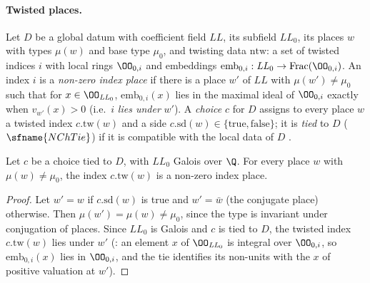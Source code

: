 \paragraph{Twisted places.} Let $D$ be a global datum with coefficient field $\mathit{LL}$, its subfield $\mathit{LL}_0$, its places
$w$ with types $\mu(w)$ and base type $\mu_0$, and twisting data $\mathrm{ntw}$: a set of twisted indices $i$ with local rings $\OO_{0,i}$
and embeddings $\mathrm{emb}_{0,i}:\mathit{LL}_0\to\mathrm{Frac}(\OO_{0,i})$. An index $i$ is a \emph{non-zero index place} if there is a place
$w'$ of $\mathit{LL}$ with $\mu(w')\ne\mu_0$ such that for $x\in\OO_{\mathit{LL}_0}$, $\mathrm{emb}_{0,i}(x)$ lies in the maximal ideal of
$\OO_{0,i}$ exactly when $v_{w'}(x)>0$ (i.e.\ $i$ \emph{lies under} $w'$). A \emph{choice} $c$ for $D$ assigns to every place $w$ a
twisted index $c.\mathrm{tw}(w)$ and a side $c.\mathrm{sd}(w)\in\{\mathrm{true},\mathrm{false}\}$; it is \emph{tied} to $D$
($\sfname{NChTie}$) if it is compatible with the local data of $D$ \cite{LeanSource2026}.

\begin{proposition}\label{pf:sh-div:twisted}
Let $c$ be a choice tied to $D$, with $\mathit{LL}_0$ Galois over $\Q$. For every place $w$ with $\mu(w)\ne\mu_0$, the index
$c.\mathrm{tw}(w)$ is a non-zero index place.
\end{proposition}

\begin{proof}
Let $w'=w$ if $c.\mathrm{sd}(w)$ is true and $w'=\bar w$ (the conjugate place) otherwise. Then $\mu(w')=\mu(w)\ne\mu_0$, since the type is
invariant under conjugation of places. Since $\mathit{LL}_0$ is Galois and $c$ is tied to $D$, the twisted index $c.\mathrm{tw}(w)$ lies
under $w'$ (: an element $x$ of $\OO_{\mathit{LL}_0}$ is integral over
$\OO_{0,i}$, so $\mathrm{emb}_{0,i}(x)$ lies in $\OO_{0,i}$, and the tie identifies its non-units with the $x$ of positive valuation at
$w'$).
\end{proof}

